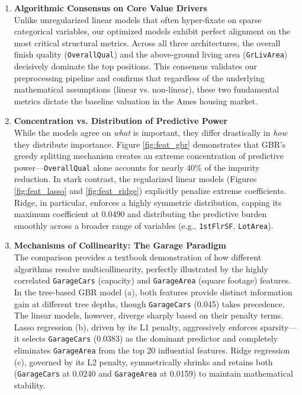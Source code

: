 \documentclass[11pt]{article}
\begin{document}
\vspace{0.3cm}
\begin{enumerate}[label=\textbf{\arabic*.}, leftmargin=*]
\item \textbf{Algorithmic Consensus on Core Value Drivers} \\
Unlike unregularized linear models that often hyper-fixate on sparse categorical variables, our optimized models exhibit perfect alignment on the most critical structural metrics. Across all three architectures, the overall finish quality (\texttt{OverallQual}) and the above-ground living area (\texttt{GrLivArea}) decisively dominate the top positions. This consensus validates our preprocessing pipeline and confirms that regardless of the underlying mathematical assumptions (linear vs. non-linear), these two fundamental metrics dictate the baseline valuation in the Ames housing market.

\vspace{0.3cm}

\item \textbf{Concentration vs. Distribution of Predictive Power} \\
While the models agree on \textit{what} is important, they differ drastically in \textit{how} they distribute importance. Figure \ref{fig:feat_gbr} demonstrates that GBR's greedy splitting mechanism creates an extreme concentration of predictive power—\texttt{OverallQual} alone accounts for nearly 40\% of the impurity reduction. In stark contrast, the regularized linear models (Figures \ref{fig:feat_lasso} and \ref{fig:feat_ridge}) explicitly penalize extreme coefficients. Ridge, in particular, enforces a highly symmetric distribution, capping its maximum coefficient at 0.0490 and distributing the predictive burden smoothly across a broader range of variables (e.g., \texttt{1stFlrSF}, \texttt{LotArea}).

\vspace{0.3cm}

\item \textbf{Mechanisms of Collinearity: The Garage Paradigm} \\
The comparison provides a textbook demonstration of how different algorithms resolve multicollinearity, perfectly illustrated by the highly correlated \texttt{GarageCars} (capacity) and \texttt{GarageArea} (square footage) features. In the tree-based GBR model (a), both features provide distinct information gain at different tree depths, though \texttt{GarageCars} (0.045) takes precedence. The linear models, however, diverge sharply based on their penalty terms. Lasso regression (b), driven by its L1 penalty, aggressively enforces sparsity—it selects \texttt{GarageCars} (0.0383) as the dominant predictor and completely eliminates \texttt{GarageArea} from the top 20 influential features. Ridge regression (c), governed by its L2 penalty, symmetrically shrinks and retains both (\texttt{GarageCars} at 0.0240 and \texttt{GarageArea} at 0.0159) to maintain mathematical stability.


\end{enumerate}
\end{document}
